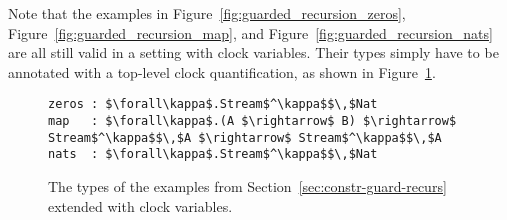 Note that the examples in Figure~\ref{fig:guarded_recursion_zeros}, Figure~\ref{fig:guarded_recursion_map}, and Figure~\ref{fig:guarded_recursion_nats} are all still valid in a setting with clock variables. Their types simply have to be annotated with a top-level clock quantification, as shown in Figure~\ref{fig:guarded_recursion_quantified_examples}.

\begin{figure}
\begin{lstlisting}[mathescape]
zeros : $\forall\kappa$.Stream$^\kappa$$\,$Nat
map   : $\forall\kappa$.(A $\rightarrow$ B) $\rightarrow$ Stream$^\kappa$$\,$A $\rightarrow$ Stream$^\kappa$$\,$A
nats  : $\forall\kappa$.Stream$^\kappa$$\,$Nat
\end{lstlisting}
\caption{The types of the examples from Section~\ref{sec:constr-guard-recurs} extended with clock variables.}
\label{fig:guarded_recursion_quantified_examples}
\end{figure}
\paragraph{}


